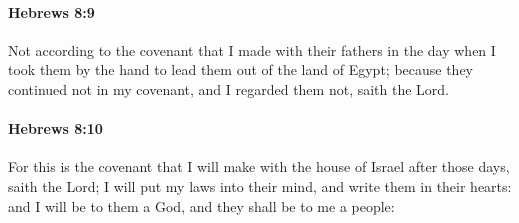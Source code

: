 		\paragraph{Hebrews 8:9} %
			\label{HEBREWS-8-9}

			Not according to the covenant that I made with their fathers in the day when I took them by the hand to lead them out of the land of Egypt; because they continued not in my covenant, and I regarded them not, saith the Lord.

			\begin{framed}
			\scriptsize
				\begin{compactdesc}
					\item[SBLG] 
				\end{compactdesc}
			\end{framed}

		\paragraph{Hebrews 8:10} %
			\label{HEBREWS-8-10}

			For this is the covenant that I will make with the house of Israel after those days, saith the Lord; I will put my laws into their mind, and write them in their hearts: and I will be to them a God, and they shall be to me a people:

